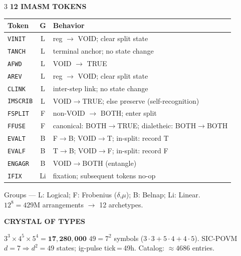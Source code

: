 \documentclass[7pt]{article}
\newcommand{\shead}[1]{%
  \vspace{2pt}%
  {\fontsize{6pt}{6.5pt}\selectfont\sffamily\bfseries\textcolor{hd}{\MakeUppercase{#1}}}%
  \vspace{0.3pt}\newline{\color{rl}\hrule height 0.2pt}\vspace{1pt}%
}
\newcommand{\tok}[1]{{\fontsize{8.5pt}{9.5pt}\selectfont\fontseries{b}\selectfont\texttt{#1}}}
\begin{document}
\begin{multicols}{3}
\vspace{1pt}
\shead{12 IMASM Tokens}

{\fontsize{6.5pt}{7.8pt}\selectfont
\begin{tabular}{@{}l@{\;}c@{\;}p{54mm}@{}}
\toprule
\textbf{Token} & \textbf{G} & \textbf{Behavior} \\
\midrule
\tok{VINIT}   & L & reg $\to$ VOID; clear split state \\
\tok{TANCH}   & L & terminal anchor; no state change \\
\tok{AFWD}    & L & VOID $\to$ TRUE \\
\tok{AREV}    & L & reg $\to$ VOID; clear split state \\
\tok{CLINK}   & L & inter-step link; no state change \\
\tok{IMSCRIB} & L & VOID$\to$TRUE; else preserve (self-recognition) \\
\tok{FSPLIT}  & F & non-VOID $\to$ BOTH; enter split \\
\tok{FFUSE}   & F & canonical: BOTH$\to$TRUE;\; dialetheic: BOTH$\to$BOTH \\
\tok{EVALT}   & B & F$\to$B; VOID$\to$T; in-split: record T \\
\tok{EVALF}   & B & T$\to$B; VOID$\to$F; in-split: record F \\
\tok{ENGAGR}  & B & VOID$\to$BOTH (entangle) \\
\tok{IFIX}    & Li & fixation; subsequent tokens no-op \\
\bottomrule
\end{tabular}

Groups — L: Logical;\; F: Frobenius ($\delta$,$\mu$);\; B: Belnap;\; Li: Linear.\\
$12^8 = 429\text{M}$ arrangements $\to$ 12 archetypes.
}

\columnbreak

\shead{Crystal of Types}
$3^3\!\times\!4^5\!\times\!5^4 = \mathbf{17{,}280{,}000}$\quad
$49=7^2$ symbols ($3\!\cdot\!3+5\!\cdot\!4+4\!\cdot\!5$).
SIC-POVM $d\!=\!7 \Rightarrow d^2\!=\!49$ states; ig-pulse tick\,=\,49h.
Catalog: ${\approx}4686$ entries.


\end{multicols}
\end{document}
